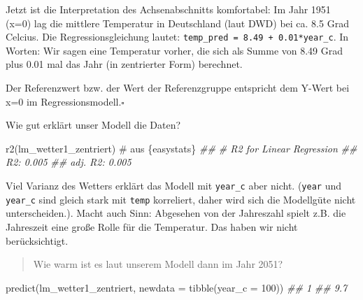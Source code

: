 \documentclass[
  letterpaper,
]{scrbook}
\newenvironment{Shaded}{\begin{snugshade}}{\end{snugshade}}
\newcommand{\AttributeTok}[1]{\textcolor[rgb]{0.40,0.45,0.13}{#1}}
\newcommand{\CommentTok}[1]{\textcolor[rgb]{0.37,0.37,0.37}{#1}}
\newcommand{\DecValTok}[1]{\textcolor[rgb]{0.68,0.00,0.00}{#1}}
\newcommand{\DocumentationTok}[1]{\textcolor[rgb]{0.37,0.37,0.37}{\textit{#1}}}
\newcommand{\FunctionTok}[1]{\textcolor[rgb]{0.28,0.35,0.67}{#1}}
\newcommand{\NormalTok}[1]{\textcolor[rgb]{0.00,0.23,0.31}{#1}}
\theoremstyle{definition}
\theoremstyle{definition}
\theoremstyle{definition}
\theoremstyle{remark}
\begin{document}
Jetzt ist die Interpretation des Achsenabschnitts komfortabel: Im Jahr
1951 (x=0) lag die mittlere Temperatur in Deutschland (laut DWD) bei ca.
8.5 Grad Celcius. Die Regressionsgleichung lautet:
\texttt{temp\_pred\ =\ 8.49\ +\ 0.01*year\_c}. In Worten: Wir sagen eine
Temperatur vorher, die sich als Summe von 8.49 Grad plus 0.01 mal das
Jahr (in zentrierter Form) berechnet.

\begin{tcolorbox}[enhanced jigsaw, left=2mm, toptitle=1mm, toprule=.15mm, rightrule=.15mm, leftrule=.75mm, breakable, colbacktitle=quarto-callout-important-color!10!white, colback=white, coltitle=black, bottomtitle=1mm, opacityback=0, title=\textcolor{quarto-callout-important-color}{\faExclamation}\hspace{0.5em}{Referenzwert entspricht Null}, colframe=quarto-callout-important-color-frame, arc=.35mm, opacitybacktitle=0.6, bottomrule=.15mm, titlerule=0mm]

Der Referenzwert bzw. der Wert der Referenzgruppe entspricht dem Y-Wert
bei x=0 im Regressionsmodell.\(\square\)

\end{tcolorbox}

Wie gut erklärt unser Modell die Daten?

\begin{Shaded}
\begin{Highlighting}[]
\FunctionTok{r2}\NormalTok{(lm\_wetter1\_zentriert)  }\CommentTok{\# aus \textasciigrave{}\{easystats\}\textasciigrave{}}
\DocumentationTok{\#\# \# R2 for Linear Regression}
\DocumentationTok{\#\#        R2: 0.005}
\DocumentationTok{\#\#   adj. R2: 0.005}
\end{Highlighting}
\end{Shaded}

Viel Varianz des Wetters erklärt das Modell mit \texttt{year\_c} aber
nicht. (\texttt{year} und \texttt{year\_c} sind gleich stark mit
\texttt{temp} korreliert, daher wird sich die Modellgüte nicht
unterscheiden.). Macht auch Sinn: Abgesehen von der Jahreszahl spielt
z.B. die Jahreszeit eine große Rolle für die Temperatur. Das haben wir
nicht berücksichtigt.

\begin{quote}
{} Wie warm ist es laut unserem Modell dann im Jahr 2051?
\end{quote}

\begin{Shaded}
\begin{Highlighting}[]
\FunctionTok{predict}\NormalTok{(lm\_wetter1\_zentriert, }\AttributeTok{newdata =} \FunctionTok{tibble}\NormalTok{(}\AttributeTok{year\_c =} \DecValTok{100}\NormalTok{))}
\DocumentationTok{\#\#   1 }
\DocumentationTok{\#\# 9.7}
\end{Highlighting}
\end{Shaded}
\end{document}
